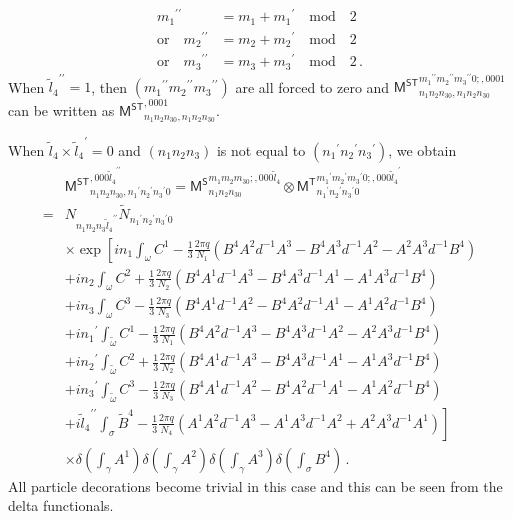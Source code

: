 \documentclass[11pt,nofootinbib,preprint]{revtex4-1}
\begin{document}
\begin{align}
	{m_1}^{\prime\prime}&=m_1+{m_1}^{\prime} \quad \text{mod} \quad 2  \nonumber 
	\\
	\text{or}\quad {m_2}^{\prime\prime}&=m_2+{m_2}^{\prime} \quad \text{mod} \quad 2  \nonumber 
	\\
	\text{or}\quad {m_3}^{\prime\prime}&=m_3+{m_3}^{\prime} \quad \text{mod} \quad 2 \,.
\end{align}
When ${\tilde{l}_4}^{\prime\prime}=1$, then $\left( {m_1}^{\prime\prime}{m_2}^{\prime\prime}{m_3}^{\prime\prime} \right)$ are all forced to zero and ${\mathsf{M}^{\mathsf{ST}}}_{n_1n_2n_30,n_1n_2n_30}^{{m_1}^{\prime\prime}{m_2}^{\prime\prime}{m_3}^{\prime\prime}0;,0001}$ can be written as ${\mathsf{M}^{\mathsf{ST}}}_{n_1n_2n_30,n_1n_2n_30}^{,0001}$.

When $\tilde{l}_4\times{\tilde{l}_4}^{\prime}=0$ and $\left(n_1n_2n_3\right)$ is not equal to $\left({n_1}^{\prime}{n_2}^{\prime}{n_3}^{\prime}\right)$, we obtain
\begin{align}
	&{\mathsf{M}^{\mathsf{ST}}}_{n_1n_2n_30,{n_1}^{\prime}{n_2}^{\prime}{n_3}^{\prime}0}^{,000{\tilde{l}_4}^{\prime\prime}}={\mathsf{M}^{\mathsf{S}}}_{n_1n_2n_30}^{m_1m_2m_30;,000\tilde{l}_4}\otimes {\mathsf{M}^{\mathsf{T}}}_{{n_1}^{\prime}{n_2}^{\prime}{n_3}^{\prime}0}^{{m_1}^{\prime}{m_2}^{\prime}{m_3}^{\prime}0;,000{\tilde{l}_4}^{\prime}}\nonumber
	\\
	=&N_{n_1n_2n_3{\tilde{l}_4}^{\prime\prime}}\tilde{N}_{{n_1}^{\prime}{n_2}^{\prime}{n_3}^{\prime}0}\nonumber
	\\
	&\times\exp \left[ in_1\int_{\omega}{C^1-\frac{1}{3}\frac{2\pi q}{N_1}\left( B^4A^2d^{-1}A^3-B^4A^3d^{-1}A^2-A^2A^3d^{-1}B^4 \right)} \right. \nonumber
	\\
	&+in_2\int_{\omega}{C^2+\frac{1}{3}\frac{2\pi q}{N_2}\left( B^4A^1d^{-1}A^3-B^4A^3d^{-1}A^1-A^1A^3d^{-1}B^4 \right)}\nonumber
	\\
	&+in_3\int_{\omega}{C^3-\frac{1}{3}\frac{2\pi q}{N_3}\left( B^4A^1d^{-1}A^2-B^4A^2d^{-1}A^1-A^1A^2d^{-1}B^4 \right)}\nonumber
	\\
	&+{in_1}^{\prime}\int_{\tilde{\omega}}{C^1-\frac{1}{3}\frac{2\pi q}{N_1}\left( B^4A^2d^{-1}A^3-B^4A^3d^{-1}A^2-A^2A^3d^{-1}B^4 \right)}\nonumber
	\\
	&+{in_2}^{\prime}\int_{\tilde{\omega}}{C^2+\frac{1}{3}\frac{2\pi q}{N_2}\left( B^4A^1d^{-1}A^3-B^4A^3d^{-1}A^1-A^1A^3d^{-1}B^4 \right)}\nonumber
	\\
	&+{in_3}^{\prime}\int_{\tilde{\omega}}{C^3-\frac{1}{3}\frac{2\pi q}{N_3}\left( B^4A^1d^{-1}A^2-B^4A^2d^{-1}A^1-A^1A^2d^{-1}B^4 \right)}\nonumber
	\\
	&\left. +{i\tilde{l}_4}^{\prime\prime}\int_{\sigma}{\tilde{B}^4}-\frac{1}{3}\frac{2\pi q}{N_4}\left( A^1A^2d^{-1}A^3-A^1A^3d^{-1}A^2+A^2A^3d^{-1}A^1 \right) \right] \nonumber
	\\
	&\times \delta \left( \int_{\gamma}{A^1} \right) \delta \left( \int_{\gamma}{A^2} \right) \delta \left( \int_{\gamma}{A^3} \right) \delta \left( \int_{\sigma}{B^4} \right) \,.
	\label{eq_MST2}
\end{align}
All particle decorations become trivial in this case and this can be seen from the delta functionals. 
\end{document}
